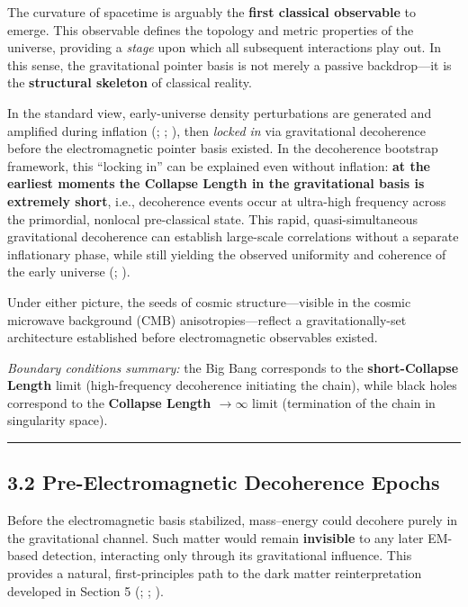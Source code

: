 \documentclass[
]{article}
\begin{document}
The curvature of spacetime is arguably the \textbf{first classical
observable} to emerge. This observable defines the topology and metric
properties of the universe, providing a \emph{stage} upon which all
subsequent interactions play out. In this sense, the gravitational
pointer basis is not merely a passive backdrop---it is the
\textbf{structural skeleton} of classical reality.

In the standard view, early-universe density perturbations are generated
and amplified during inflation (;
;
), then \emph{locked in} via
gravitational decoherence before the electromagnetic pointer basis
existed. In the decoherence bootstrap framework, this ``locking in'' can
be explained even without inflation: \textbf{at the earliest moments the
Collapse Length in the gravitational basis is extremely short}, i.e.,
decoherence events occur at ultra-high frequency across the primordial,
nonlocal pre-classical state. This rapid, quasi-simultaneous
gravitational decoherence can establish large-scale correlations without
a separate inflationary phase, while still yielding the observed
uniformity and coherence of the early universe
(;
).

Under either picture, the seeds of cosmic structure---visible in the
cosmic microwave background (CMB) anisotropies---reflect a
gravitationally-set architecture established before electromagnetic
observables existed.

\emph{Boundary conditions summary:} the Big Bang corresponds to the
\textbf{short-Collapse Length} limit (high-frequency decoherence
initiating the chain), while black holes correspond to the
\textbf{Collapse Length \(\to \infty\)} limit (termination of the chain
in singularity space).

\begin{center}\rule{0.5\linewidth}{0.5pt}\end{center}

\subsection{3.2 Pre-Electromagnetic Decoherence
Epochs}\label{pre-electromagnetic-decoherence-epochs}

Before the electromagnetic basis stabilized, mass--energy could decohere
purely in the gravitational channel. Such matter would remain
\textbf{invisible} to any later EM-based detection, interacting only
through its gravitational influence. This provides a natural,
first-principles path to the dark matter reinterpretation developed in
Section 5 (;
;
).
\end{document}
